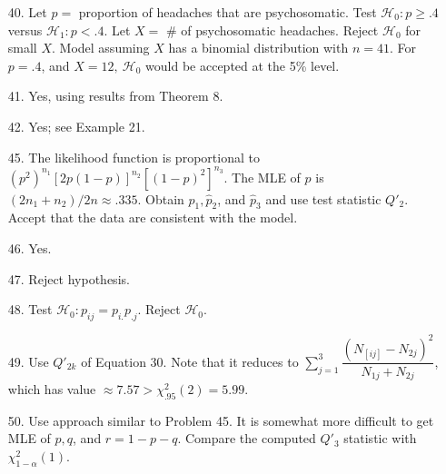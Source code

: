 \begin{enumerate}
\begin{enumerate}
	\end{enumerate}
	
	\item[40.] Let $p =$ proportion of headaches that are psychosomatic.  Test $\mathscr{H}_0\colon p \ge .4$ versus $\mathscr{H}_1\colon p<.4$. Let $X =$ \# of psychosomatic headaches. Reject $\mathscr{H}_0$ for small $X$. Model assuming $X$ has a binomial distribution with $n=41$. For $p=.4$, and $X=12,\ \mathscr{H}_0$ would be accepted at the 5\% level.  
	
	\item[41.] Yes, using results from Theorem 8.
	
	\item[42.] Yes; see Example 21.
	
	\item[45.] The likelihood function is proportional to $(p^2)^{n_1}[2p(1-p)]^{n_2}[(1-p)^2]^{n_3}$. The MLE of $p$ is $(2n_1+n_2)/2n \approx .335$. Obtain $\hat{p}_1, \hat{p}_2$, and $\hat{p}_3$ and use test statistic $Q'_2$.  Accept that the data are consistent with the model.
	
	\item[46.] Yes.
	
	\item[47.] Reject hypothesis.
	
	\item[48.] Test $\mathscr{H}_0\colon p_{ij}=p_{i.}p_{.j}$. Reject $\mathscr{H}_0$.
	
	\item[49.] Use $Q'_{2k}$ of Equation 30. Note that it reduces to $\sum\limits_{j=1}^3\dfrac{(N_[ij]-N_{2j})^2}{N_{1j}+N_{2j}}$, which has value $\approx 7.57 > \chi^2_{.95}(2) = 5.99$.
	
	\item[50.] Use approach similar to Problem 45. It is somewhat more difficult to get MLE of $p, q$, and $r=1-p-q$. Compare the computed $Q'_3$ statistic with $\chi^2_{1-\alpha}(1)$.
\end{enumerate}